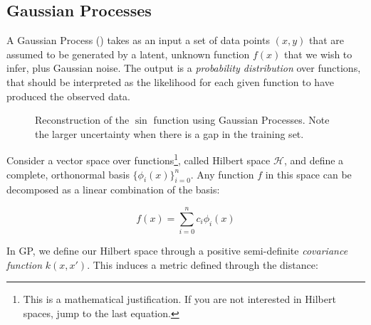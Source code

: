 \subsection{Gaussian Processes}
A Gaussian Process (\GP) takes as an input a set of data points $(x, y)$ that are assumed to be generated by a latent, unknown function $f(x)$ that we wish to infer, plus Gaussian noise. The output is a \emph{probability distribution} over functions, that should be interpreted as the likelihood for each given function to have produced the observed data.


\begin{figure}[htb]
	\centering
	\hfill
	\caption{Reconstruction of the $\sin$ function using Gaussian Processes.
	Note the larger uncertainty when there is a gap in the training set.}\label{fig:gp_toy}
\end{figure}


Consider a vector space over functions\footnote{This is a mathematical justification. If you are not interested in Hilbert spaces, jump to the last equation.}, called Hilbert space $\mathscr{H}$, and define a complete, orthonormal basis $\{\phi_i(x)\}_{i=0}^{n}$.
Any function $f$ in this space can be decomposed as a linear combination of the basis:

 \[f(x) = \sum_{i=0}^{n} c_i \phi_i(x)\]
 
In GP, we define our Hilbert space through a positive semi-definite \emph{covariance function} $k(x, x')$.
This induces a metric defined through the distance:

